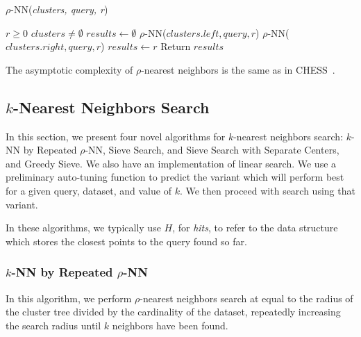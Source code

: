 \begin{algorithm} 
    \caption{$\rho$-NN(\emph{clusters, query, r})} 
    \label{alg:rnn} 
    \begin{algorithmic}[2]
        \REQUIRE $r \geq 0$
        \REQUIRE $clusters \neq \emptyset$
        \STATE $results \leftarrow \emptyset$
                \STATE $\rho$-NN($clusters.left, query, r$)
            \ENDIF
        \ENDIF
                \STATE $\rho$-NN($clusters.right, query, r$)
            \ENDIF
        \ENDIF
                    \STATE $results \leftarrow r$
                \ENDIF
            \ENDFOR
        \ENDIF
        \STATE Return $results$
    \end{algorithmic}
    \end{algorithm}

The asymptotic complexity of $\rho$-nearest neighbors is the same as in CHESS~\cite{ishaq2019clustered}.

\subsection{\texorpdfstring{$k$}{k}-Nearest Neighbors Search}
\label{subsec:methods:knn-search}

In this section, we present four novel algorithms for $k$-nearest neighbors search: $k$-NN by Repeated $\rho$-NN, Sieve Search, and Sieve Search with Separate Centers, 
and  Greedy Sieve. 
We also have an implementation of linear search. We use a preliminary auto-tuning function to predict the variant which will perform 
best for a given query, dataset, and value of $k$. We then proceed with search using that variant.  

In these algorithms, we typically use $H$, for \emph{hits}, to refer to the data structure which stores the closest points to the query found so far. 


\subsubsection{$k$-NN by Repeated $\rho$-NN}
\label{subsubsec:methods:knn-search:repeated-rnn}
In this algorithm, we perform
$\rho$-nearest neighbors search at equal to the radius of the cluster tree divided by
the cardinality of the dataset, repeatedly increasing the search radius until $k$ neighbors
have been found.

